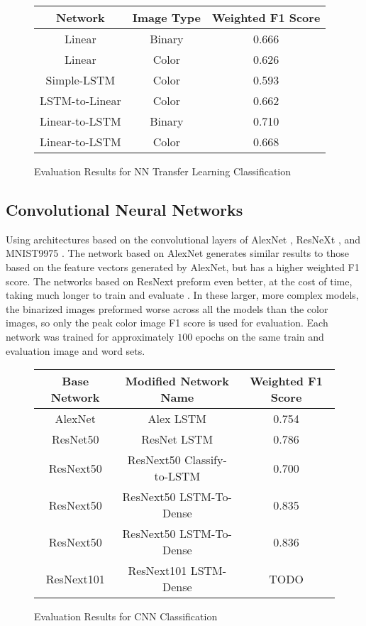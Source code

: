\begin{figure}[H]
    \caption{Evaluation Results for NN Transfer Learning Classification}
    \label{fig:classificationFeatureVectorNN}
    \centering
    \begin{tabular}{ | c | c | c | }
        \hline
        Network & Image Type & Weighted F1 Score \\
        \hline
        Linear & Binary & 0.666 \\
        Linear & Color & 0.626 \\
        Simple-LSTM & Color & 0.593 \\
        LSTM-to-Linear & Color & 0.662 \\
        Linear-to-LSTM & Binary & 0.710 \\
        Linear-to-LSTM & Color & 0.668 \\
        \hline
    \end{tabular}
\end{figure}

\subsection{Convolutional Neural Networks}

Using architectures based on the convolutional layers of AlexNet \cite{Krizhevsky}, ResNeXt \cite{Xie}, and MNIST9975 \cite{Deotte}. The network based on AlexNet generates similar results to those based on the feature vectors generated by AlexNet, but has a higher weighted F1 score. The networks based on ResNext preform even better, at the cost of time, taking much longer to train and evaluate . In these larger, more complex models, the binarized images preformed worse across all the models than the color images, so only the peak color image F1 score is used for evaluation. Each network was trained for approximately $100$ epochs on the same train and evaluation image and word sets.

\begin{figure}[H]
    \caption{Evaluation Results for CNN Classification}
    \label{fig:classificationCNN}
    \centering
    \begin{tabular}{ | c | c | c | }
        \hline
        Base Network & Modified Network Name & Weighted F1 Score \\
        \hline
        AlexNet & Alex LSTM & 0.754 \\
        ResNet50 & ResNet LSTM & 0.786 \\
        ResNext50 & ResNext50 Classify-to-LSTM & 0.700 \\
        ResNext50 & ResNext50 LSTM-To-Dense & 0.835 \\
        ResNext50 & ResNext50 LSTM-To-Dense & 0.836 \\
        ResNext101 & ResNext101 LSTM-Dense & TODO \\
        \hline
    \end{tabular}
\end{figure}

